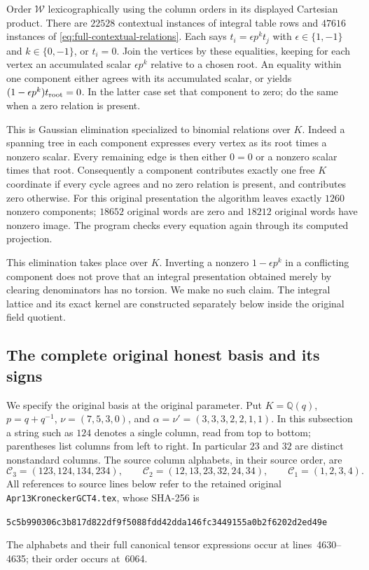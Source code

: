 Order $\mathcal W$ lexicographically using the column orders in
its displayed Cartesian product. There are $22528$ contextual
instances of integral table rows and $47616$ instances of
\eqref{eq:full-contextual-relations}. Each says
$t_i=\epsilon p^kt_j$ with $\epsilon\in\{1,-1\}$ and
$k\in\{0,-1\}$, or $t_i=0$.
Join the vertices by these equalities, keeping for each vertex
an accumulated scalar $\epsilon p^k$ relative to a chosen root.
An equality within one component either agrees with its
accumulated scalar, or yields
$(1-\epsilon p^k)t_{\rm root}=0$. In the latter case set that
component to zero; do the same when a zero relation is present.

This is Gaussian elimination specialized to binomial relations
over $K$. Indeed a spanning tree in each component expresses
every vertex as its root times a nonzero scalar. Every remaining
edge is then either $0=0$ or a nonzero scalar times that root.
Consequently a component contributes exactly one free $K$
coordinate if every cycle agrees and no zero relation is present,
and contributes zero otherwise. For this original presentation
the algorithm leaves exactly $1260$ nonzero components; $18652$
original words are zero and $18212$ original words have nonzero
image. The program checks every equation again through its
computed projection.

This elimination takes place over $K$. Inverting a nonzero
$1-\epsilon p^k$ in a conflicting component does not prove that
an integral presentation obtained merely by clearing denominators
has no torsion. We make no such claim. The integral lattice and
its exact kernel are constructed separately below inside the
original field quotient.

\subsection{The complete original honest basis and its signs}
\label{fullbasis:enumeration}

We specify the original basis at the original parameter.  Put
$K=\mathbb Q(q)$, $p=q+q^{-1}$, $\nu=(7,5,3,0)$, and
$\alpha=\nu'=(3,3,3,2,2,1,1)$.  In this subsection a string such as
$124$ denotes a single column, read from top to bottom; parentheses list
columns from left to right.  In particular $23$ and $32$ are distinct
nonstandard columns.  The source column alphabets, in their source order,
are
\[
\mathcal C_3=(123,124,134,234),\qquad
\mathcal C_2=(12,13,23,32,24,34),\qquad
\mathcal C_1=(1,2,3,4).
\]
All references to source lines below refer to the retained original
\texttt{Apr13KroneckerGCT4.tex}, whose SHA-256 is
\begin{center}\small
\texttt{5c5b990306c3b817d822df9f5088fdd42dda146fc3449155a0b2f6202d2ed49e}
\end{center}
The alphabets and their full canonical tensor expressions occur at
lines~4630--4635; their order occurs at~6064.

